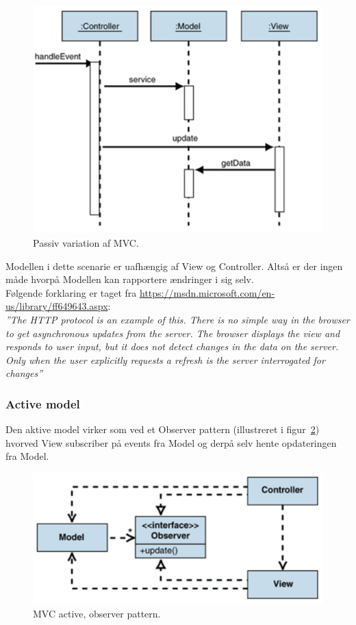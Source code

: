 \begin{figure}[H]
	\centering
	\includegraphics[width=0.6\linewidth]{figs/MVC/mvc_passive}
	\caption{Passiv variation af MVC.}
	\label{fig:mvc_passive}
\end{figure}

Modellen i dette scenarie er uafhængig af View og Controller. Altså er der ingen måde hvorpå Modellen kan rapportere ændringer i sig selv.\\

Følgende forklaring er taget fra \url{https://msdn.microsoft.com/en-us/library/ff649643.aspx}:\\

\textit{''The HTTP protocol is an example of this. There is no simple way in the browser to get asynchronous updates from the server. The browser displays the view and responds to user input, but it does not detect changes in the data on the server. Only when the user explicitly requests a refresh is the server interrogated for changes''}

\subsubsection{Active model}
Den aktive model virker som ved et Observer pattern (illustreret i figur~\ref{fig:mvc_observer}) hvorved View subscriber på events fra Model og derpå selv hente opdateringen fra Model.

\begin{figure}[h]
	\centering
	\includegraphics[width=0.6\linewidth]{figs/MVC/mvc_observer}
	\caption{MVC active, observer pattern.}
	\label{fig:mvc_observer}
\end{figure}

